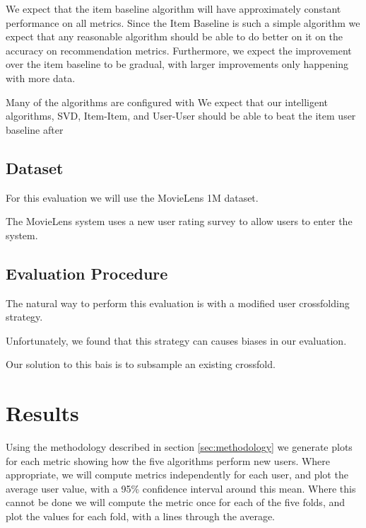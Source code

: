 \documentclass[letterpaper]{sig-alternate}
\begin{document}
  We expect that the item baseline algorithm will have approximately constant performance on all metrics.
  Since the Item Baseline is such a simple algorithm we expect that any reasonable algorithm should be able to do better on it on the accuracy on recommendation metrics.
  Furthermore, we expect the improvement over the item baseline to be gradual, with larger improvements only happening with more data.
  
  Many of the algorithms are configured with 
  We expect that our intelligent algorithms, SVD, Item-Item, and User-User should be able to beat the item user baseline after 
  
  \subsection*{Dataset}
  For this evaluation we will use the MovieLens 1M dataset.

  The MovieLens system uses a new user rating survey to allow users to enter the system.
  
  \subsection*{Evaluation Procedure}
  The natural way to perform this evaluation is with a modified user crossfolding strategy.
  
  Unfortunately, we found that this strategy can causes biases in our evaluation.
  
  Our solution to this bais is to subsample an existing crossfold.

\section{Results}

  Using the methodology described in section \ref{sec:methodology} we generate plots for each metric showing how the five algorithms perform new users.
  Where appropriate, we will compute metrics independently for each user, and plot the average user value, with a 95\% confidence interval around this mean.
  Where this cannot be done we will compute the metric once for each of the five folds, and plot the values for each fold, with a lines through the average.
\end{document}

